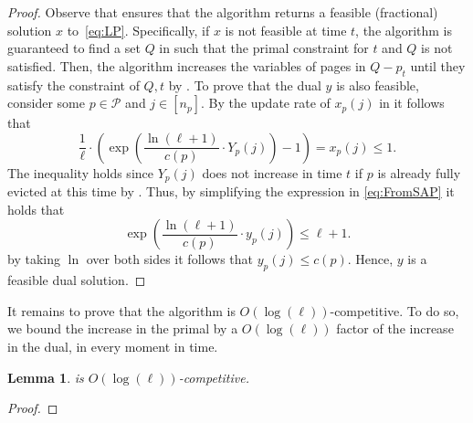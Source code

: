 \documentclass[11pt]{article}
\newcommand{\cP}{{\mathcal{P}}}
\newtheorem{lemma}[thm]{Lemma}
\begin{document}
{\begin{proof}
	Observe that  ensures that the algorithm returns a feasible (fractional) solution $x$ to~\eqref{eq:LP}. Specifically, if $x$ is not feasible at time $t$, the algorithm is guaranteed to find a set $Q$ in  such that the primal constraint for $t$ and $Q$ is not satisfied. Then, the algorithm increases the variables of pages in $Q-p_t$ until they satisfy the constraint of $Q,t$ by  . To prove that the dual $y$ is also feasible, consider some $p \in \cP$ and $j \in [n_p]$. By the update rate of $x_p(j)$ in  it follows that 
	\begin{equation}
		\label{eq:FromSAP}
		\frac{1}{\ell} \cdot \left(     \exp \left(  \frac{\ln (\ell+1)}{c(p)} \cdot Y_p(j)\right)-1\right) = x_p(j) \leq 1.
	\end{equation} 
	The inequality holds since $Y_p(j)$ does not increase in time $t$ if $p$ is already fully evicted at this time by . Thus, by simplifying the expression in \eqref{eq:FromSAP} it holds that 
	$$\exp \left( \frac{\ln (\ell+1)}{c(p)} \cdot y_p(j) \right) \leq \ell+1.$$
	by taking $\ln$ over both sides it follows that $y_p(j) \leq c(p)$. Hence, $y$ is a feasible dual solution. 
\end{proof}



It remains to prove that the algorithm is $O(\log (\ell))$-competitive. To do so, we bound the increase in the primal by a $O(\log (\ell))$ factor of the increase in the dual, in every moment in time. 


%
\begin{lemma}
	\label{thm:logL1}
	 is $O(\log (\ell))$-\textnormal{competitive}. 
\end{lemma}

\begin{proof}
	
	
	

\end{proof}}
\end{document}
